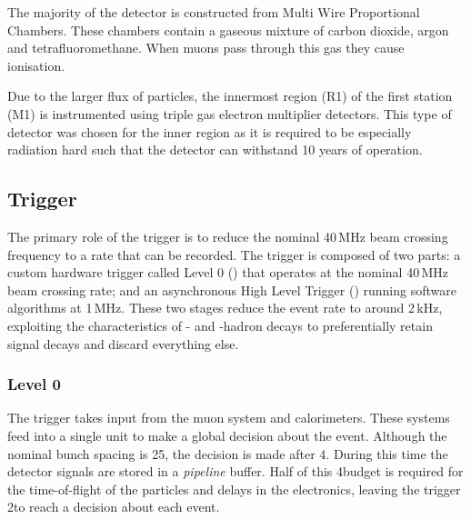 The majority of the detector is constructed from Multi Wire Proportional Chambers. These chambers contain a gaseous mixture of carbon dioxide, argon and tetrafluoromethane. When muons pass through this gas they cause ionisation. 

Due to the larger flux of particles, the innermost region (R1) of the first station (M1) is instrumented using triple gas electron multiplier detectors. 
This type of detector was chosen for the inner region as it is required to be especially radiation hard such that the detector can withstand 10 years of operation.  

\subsection{Trigger}
\label{sec:Dec_trigger}

The primary role of the trigger is to reduce the nominal 40\,MHz beam crossing frequency to a rate that can be recorded. The trigger is composed of two parts: a custom hardware trigger called Level 0 (\lone) that operates at the nominal 40\,MHz beam crossing rate; and an asynchronous High Level Trigger (\hlt) running software algorithms at 1\,MHz. These two stages reduce the event rate to around 2\,kHz, exploiting the characteristics of \bquark- and \cquark-hadron decays to preferentially retain signal decays and discard everything else.

\subsubsection{Level 0}
The \lone trigger takes input from the muon system and calorimeters. These systems feed into a single unit to make a global decision about the event. Although the nominal bunch spacing is 25\ns, the \lone decision is made after 4\mus. During this time the detector signals are stored in a \emph{pipeline} buffer. Half of this 4\mus budget is required for the time-of-flight of the particles and delays in the electronics, leaving the \lone trigger 2\mus to reach a decision about each event.  

